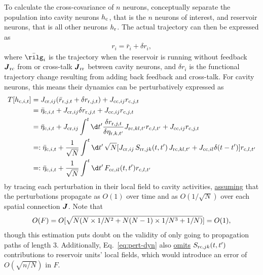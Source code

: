 \documentclass[11pt,openany,oneside]{article} %
\begin{document}
To calculate the cross-covariance of $n$ neurons, conceptually separate the population into cavity
neurons $h_{\mathrm{c}}$, that is the $n$ neurons of interest, and reservoir neurons, that is all other
neurons $h_{\mathrm{r}}$.  The actual trajectory can then be expressed as 
\begin{align*}
  r_i = \bar{r}_i + \delta r_i,
\end{align*}
where $\bar{\rilg}_i$ is the trajectory when the reservoir is running without feedback
$\boldsymbol{J}_{\mathrm{r}\mathrm{c}}$ from or cross-talk $\boldsymbol{J}_{\mathrm{r}\mathrm{r}}$ between cavity neurons, and $\delta r_i$
is the functional trajectory change resulting from adding back feedback and cross-talk.  For cavity
neurons, this means their dynamics can be perturbatively expressed as
\begin{equation}
  \label{eq:pert-dyn}
  \begin{aligned}
      T\lbk h_{\cula,i,t}\rbk &=J_{\cula\rula,ij}(\bar{r}_{\rula, j,t} + \delta r_{\rula, j,t}) + J_{\cula\cula,ij}r_{\cula, j,t}\\
  &=\bar{\eta}_{\cula, i,t} + J_{\cula\rula,ij}\delta r_{\rula, j,t} + J_{\cula\cula,ij}r_{\cula, j,t}\\
  &=\bar{\eta}_{\cula, i,t} + J_{\cula\rula,ij}\int^t\d t'\frac{\delta r_{\rula, j,t}}{\delta \eta_{\rula, k,t'}}J_{\rula\cula, kl,t'} r_{\cula,l,t'} + J_{\cula\cula,ij}r_{\cula, j,t}\\
  &=:\bar{\eta}_{\cula, i,t} + \frac{1}{\sqrt{N}}\int^t\d t'\,\sqrt{N}{\Lbk J_{\cula\rula,ij}\,S_{\rula\rula,jk}(t,t')\,J_{\rula\cula, kl,t'}+J_{\cula\cula,il}\delta(t-t')\Rbk} r_{\cula,l,t'}\\
  &=:\bar{\eta}_{\cula, i,t} + \frac{1}{\sqrt{N}}\int^t\d t'\,F_{\cula\cula,il}(t,t') r_{\cula,l,t'}
  \end{aligned}
\end{equation}
by tracing each perturbation in their local field to cavity activities, \uline{assuming} that the
perturbations propagate as $O(1)$ over time and as $O(1/\sqrt{N})$ over each spatial connection
$\boldsymbol{J}$.  Note that
\begin{align*}
  O(F) = O\lbrack\sqrt{N(N\times 1/N^2+N(N-1)\times 1/N^3+1/N)}\rbrack=O(1),
\end{align*}
though this estimation puts doubt on the validity of only going to propagation paths of length $3$.
Additionally, Eq.~\ref{eq:pert-dyn} also \uline{omits} $S_{\mathrm{r}\mathrm{c},jk}(t,t')$ contributions to
reservoir units' local fields, which would introduce an error of $O(\sqrt{n/N})$ in $F$.
\end{document}
